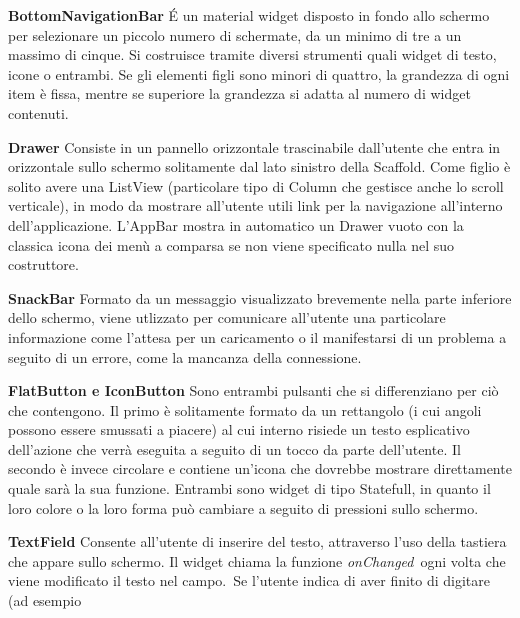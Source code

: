 \begin{trivlist}
		\item \textbf{BottomNavigationBar} \newline
		\'E un material widget disposto in fondo allo schermo per selezionare un
		piccolo numero di schermate, da un minimo di tre a un massimo di cinque.
		Si costruisce tramite diversi strumenti quali widget di testo, icone o
		entrambi. Se gli elementi figli sono minori di quattro, la grandezza di
		ogni item è fissa, mentre se superiore la grandezza si adatta al numero
		di widget contenuti.
		\item \textbf{Drawer} \newline
		Consiste in un pannello orizzontale trascinabile dall'utente che entra
		in orizzontale sullo schermo
		solitamente dal lato sinistro della Scaffold. Come figlio è solito avere
		una ListView (particolare tipo di Column che gestisce anche lo scroll
		verticale), in modo da mostrare all'utente utili link per la navigazione
		all'interno dell'applicazione. L'AppBar mostra in automatico un Drawer
		vuoto con la classica icona dei menù a comparsa se non viene specificato
		nulla nel suo costruttore.
		\item \textbf{SnackBar} \newline
		Formato da un messaggio visualizzato brevemente
		nella parte inferiore dello schermo, viene utlizzato per comunicare
		all'utente una particolare informazione come l'attesa per un caricamento
		o il manifestarsi di un problema a seguito di un errore, come la
		mancanza della connessione.
		\item \textbf{FlatButton e IconButton} \newline
		Sono entrambi pulsanti che si differenziano per ciò che contengono. Il
		primo è solitamente formato da un rettangolo (i cui angoli possono
		essere smussati a piacere) al cui interno risiede un testo esplicativo
		dell'azione che verrà eseguita a seguito di un tocco da parte
		dell'utente. Il secondo è invece circolare e contiene un'icona che
		dovrebbe mostrare direttamente quale sarà la sua funzione. Entrambi sono
		widget di tipo Statefull, in quanto il loro colore o la loro forma può
		cambiare a seguito di pressioni sullo schermo.
		\item \textbf{TextField} \newline
		Consente all'utente di inserire del testo, attraverso l'uso della
		tastiera che appare sullo schermo. Il widget chiama la funzione
		\textit{onChanged} ogni volta che viene modificato il testo nel campo. Se
		l'utente indica di aver finito di digitare (ad esempio

\end{trivlist}

